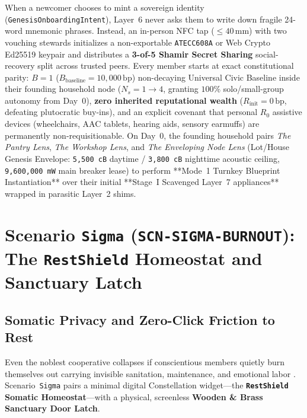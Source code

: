 When a newcomer chooses to mint a sovereign identity (\texttt{GenesisOnboardingIntent}), Layer~6 never asks them to write down fragile 24-word mnemonic phrases. Instead, an in-person NFC tap ($\le 40\,\mathrm{mm}$) with two vouching stewards initializes a non-exportable \texttt{ATECC608A} or Web Crypto Ed25519 keypair and distributes a \textbf{3-of-5 Shamir Secret Sharing} social-recovery split \parencite{shamir1979} across trusted peers. Every member starts at exact constitutional parity: $B = 1$ ($B_{\mathrm{baseline}} = 10{,}000\,\mathrm{bp}$) non-decaying Universal Civic Baseline inside their founding household node ($N_s = 1 \to 4$, granting $100\%$ solo/small-group autonomy from Day~0), \textbf{zero inherited reputational wealth} ($R_{\mathrm{init}} = 0\,\mathrm{bp}$, defeating plutocratic buy-ins), and an explicit covenant that personal $R_0$ assistive devices (wheelchairs, AAC tablets, hearing aids, sensory earmuffs) are permanently non-requisitionable. On Day~0, the founding household pairs \textit{The Pantry Lens}, \textit{The Workshop Lens}, and \textit{The Enveloping Node Lens} (Lot/House Genesis Envelope: \texttt{5,500 cB} daytime / \texttt{3,800 cB} nighttime acoustic ceiling, \texttt{9,600,000 mW} main breaker lease) to perform **Mode~1 Turnkey Blueprint Instantiation** over their initial **Stage~I Scavenged Layer~7 appliances** wrapped in parasitic Layer~2 shims.

\section{Scenario \texttt{Sigma} (\texttt{SCN-SIGMA-BURNOUT}): The \texttt{RestShield} Homeostat and Sanctuary Latch}
\label{sec:wave-a-sigma}

\subsection{Somatic Privacy and Zero-Click Friction to Rest}

Even the noblest cooperative collapses if conscientious members quietly burn themselves out carrying invisible sanitation, maintenance, and emotional labor \parencite{freeman1972,han2015}. Scenario~\texttt{Sigma} pairs a minimal digital Constellation widget---the \textbf{\texttt{RestShield} Somatic Homeostat}---with a physical, screenless \textbf{Wooden \& Brass Sanctuary Door Latch}.

